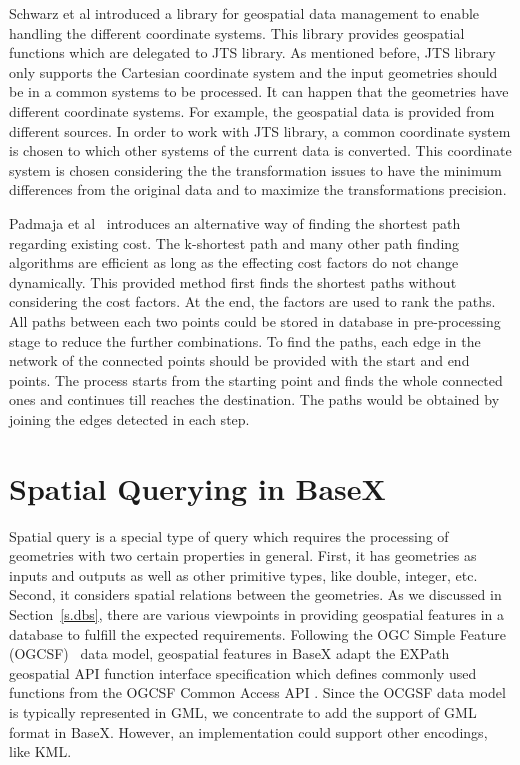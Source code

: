 \documentclass[a4paper,12pt]{article}
\begin{document}
Schwarz et al\cite{Schwarz2004} introduced a library for geospatial data management to enable handling the different coordinate systems. This library provides geospatial functions which are delegated to JTS library. As mentioned before, JTS library only supports the Cartesian coordinate system and the input geometries should be in a common systems to be processed. It can happen that the geometries have different coordinate systems. For example, the geospatial data is provided from different sources. In order to work with JTS library, a common coordinate system is chosen to which other systems of the current data is converted. This coordinate system is chosen considering the the transformation issues to have the minimum differences from the original data and to maximize the transformations precision.


Padmaja et al~\cite{short-path} introduces an alternative way of finding the shortest path regarding existing cost. The k-shortest path and many other path finding algorithms are efficient as long as the effecting cost factors do not change dynamically. This provided method first finds the shortest paths without considering the cost factors. At the end, the factors are used to rank the paths. All paths between each two points could be stored in database in pre-processing stage to reduce the further combinations. To find the paths, each edge in the network of the connected points should be provided with the start and end points. The process starts from the starting point and finds the whole connected ones and continues till reaches the destination. The paths would be obtained by joining the edges detected in each step.
















\newpage
\section{Spatial Querying in BaseX}
\label{s.basex}
Spatial query is a special type of query which requires the processing of geometries with two certain properties in general. First, it has geometries as inputs and outputs as well as other primitive types, like double, integer, etc. Second, it considers spatial relations between the geometries.
As we discussed in Section~\ref{s.dbs}, there are various viewpoints in providing geospatial features in a database to fulfill the expected requirements. Following the OGC Simple Feature (OGCSF)~\cite{springergeo} data model, geospatial features in BaseX adapt the EXPath geospatial API function interface specification which defines commonly used functions from the OGCSF Common Access API \cite{simpleFeature}. Since the OCGSF data model is typically represented in GML, we concentrate to add the support of GML format in BaseX. However, an implementation could support other encodings, like KML. 
\end{document}
